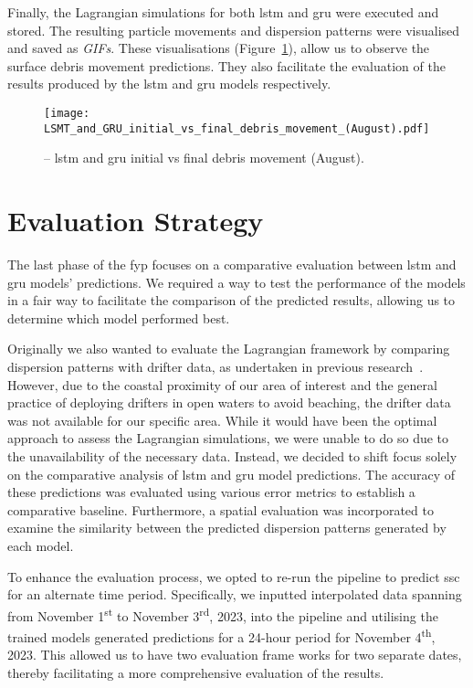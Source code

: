 Finally, the Lagrangian simulations for both \acrshort{lstm} and \acrshort{gru} were executed and stored. The resulting particle movements and dispersion patterns were visualised and saved as \textit{GIFs}. These visualisations (Figure~\ref{fig_3.9}), allow us to observe the surface debris movement predictions. They also facilitate the evaluation of the results produced by the \acrshort{lstm} and \acrshort{gru} models respectively. 

\begin{figure}[htbp]
    \centering
    \texttt{[image: LSMT\_and\_GRU\_initial\_vs\_final\_debris\_movement\_(August).pdf]}
    \caption[LSTM and GRU initial vs final debris movement (August).]{-- \acrshort{lstm} and \acrshort{gru} initial vs final debris movement (August).\label{fig_3.9}}
\end{figure}

\section{Evaluation Strategy}
\label{sec:3.5}

The last phase of the \acrshort{fyp} focuses on a comparative evaluation between \acrshort{lstm} and \acrshort{gru} models' predictions. We required a way to test the performance of the models in a fair way to facilitate the comparison of the predicted results, allowing us to determine which model performed best.

Originally we also wanted to evaluate the Lagrangian framework by comparing dispersion patterns with drifter data, as undertaken in previous research~\cite{34,38}. However, due to the coastal proximity of our area of interest and the general practice of deploying drifters in open waters to avoid beaching, the drifter data was not available for our specific area. While it would have been the optimal approach to assess the Lagrangian simulations, we were unable to do so due to the unavailability of the necessary data. Instead, we decided to shift focus solely on the comparative analysis of \acrshort{lstm} and \acrshort{gru} model predictions. The accuracy of these predictions was evaluated using various error metrics to establish a comparative baseline. Furthermore, a spatial evaluation was incorporated to examine the similarity between the predicted dispersion patterns generated by each model.

To enhance the evaluation process, we opted to re-run the pipeline to predict \acrshort{ssc} for an alternate time period. Specifically, we inputted interpolated data spanning from November 1\textsuperscript{st} to November 3\textsuperscript{rd}, 2023, into the pipeline and utilising the trained models generated predictions for a 24-hour period for November 4\textsuperscript{th}, 2023. This allowed us to have two evaluation frame works for two separate dates, thereby facilitating a more comprehensive evaluation of the results. 

